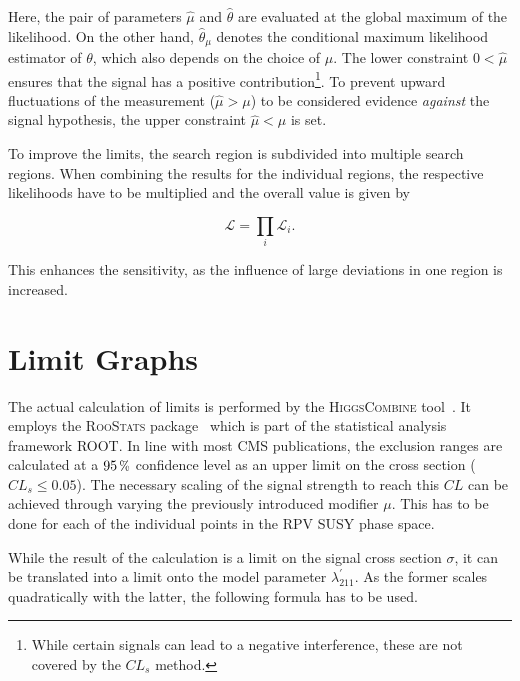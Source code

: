 \noindent Here, the pair of parameters $\hat{\mu}$ and $\hat{\theta}$ are evaluated at the global maximum of the likelihood. On the other hand, $\hat{\theta}_\mu$ denotes the conditional maximum likelihood estimator of $\theta$, which also depends on the choice of $\mu$. The lower constraint $0 < \hat{\mu}$ ensures that the signal has a positive contribution\footnote{While certain signals can lead to a negative interference, these are not covered by the $CL_s$ method.}. To prevent upward fluctuations of the measurement ($\hat{\mu} > \mu$) to be considered evidence \textit{against} the signal hypothesis, the upper constraint $\hat{\mu} < \mu$ is set.


To improve the limits, the search region is subdivided into multiple search regions. When combining the results for the individual regions, the respective likelihoods have to be multiplied and the overall value is given by

\begin{equation}
  \label{eq:likelihood-product}
  \mathcal{L} = \prod_i \mathcal{L}_i.
\end{equation}

\noindent This enhances the sensitivity, as the influence of large deviations in one region is increased.

\section{Limit Graphs}
\label{sec:limit-graphs}

The actual calculation of limits is performed by the \textsc{HiggsCombine} tool~\cite{clsmod,higgscombine}. It employs the \textsc{RooStats} package~\cite{roostats} which is part of the statistical analysis framework \textsc{ROOT}. In line with most CMS publications, the exclusion ranges are calculated at a $95\,\pct$ confidence level as an upper limit on the cross section ($CL_s \leq 0.05$). The necessary scaling of the signal strength to reach this $CL$ can be achieved through varying the previously introduced modifier $\mu$. This has to be done for each of the individual points in the RPV SUSY phase space.

While the result of the calculation is a limit on the signal cross section $\sigma$, it can be translated into a limit onto the model parameter $\lambda^\prime_{211}$. As the former scales quadratically with the latter, the following formula has to be used.

